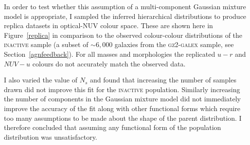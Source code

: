 

In order to test whether this assumption of a multi-component Gaussian mixture model is appropriate, I sampled the inferred hierarchical distributions to produce replica datasets in optical-NUV colour space. These are shown here in Figure~\ref{replica}  in comparison to the observed colour-colour distributions of the \textsc{inactive} sample (a subset of $\sim6,000$ galaxies from the \textsc{gz2-galex} sample, see Section~\ref{agnfeedback}). For all masses and morphologies the replicated $u-r$ and $NUV-u$ colours do not accurately match the observed data. 


I also varied the value of $N_s$ and found that increasing the number of samples drawn did not improve this fit for the \textsc{inactive} population. Similarly increasing the number of components in the Gaussian mixture model did not immediately improve the accuracy of the fit along with other functional forms which require too many assumptions to be made about the shape of the parent distribution. I therefore concluded that assuming any functional form of the population distribution was unsatisfactory. %

